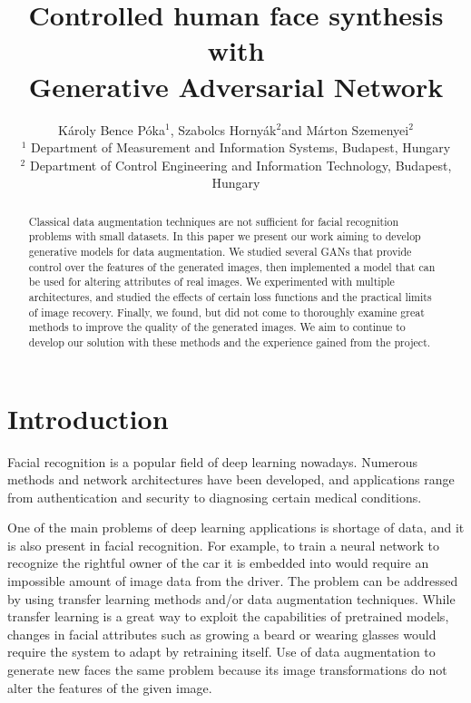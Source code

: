 \documentclass{egpubl}
\title{Controlled human face synthesis with\\
	 \space Generative Adversarial Network}
\author[Póka,Hornyák,Szemenyei]
	{Károly Bence Póka$^1$,
       Szabolcs Hornyák$^2$and
        Márton Szemenyei$^2$
        \\
        $^1$ Department of Measurement and Information Systems,
             Budapest, Hungary\\
        $^2$ Department of Control Engineering and Information Technology,
        Budapest, Hungary\\
       }
\begin{document}
\maketitle

\begin{abstract}
Classical data augmentation techniques are not sufficient for facial recognition problems with small datasets. In this paper we present our work aiming %
to develop generative models for data augmentation. We studied several GANs that provide control over the features of the generated images, then implemented %
a model that can be used for altering attributes of real images. We experimented with multiple architectures, and studied the effects of certain loss functions and the practical limits of image recovery. %
Finally, %
we found, but did not come to thoroughly examine great methods to improve the quality of the generated images. We aim to %
continue to develop our solution with these methods and the experience gained from the project.


\end{abstract}

\section{Introduction}

Facial recognition is a popular field of deep learning nowadays. Numerous methods and network architectures have been developed, %
and applications range from authentication and security to diagnosing certain medical conditions.

One of the main problems %
of deep learning applications is shortage of data, %
and it is also present %
in facial recognition. For example, %
to train a neural network to recognize the rightful owner of the car it is embedded into would require an impossible amount of image data from the driver. The problem can be addressed by using %
transfer learning methods and/or data augmentation techniques. While transfer learning is a great way to exploit the capabilities of pretrained models, changes in facial attributes such as growing a beard or wearing %
glasses would require the system to adapt by retraining itself. Use of data augmentation to generate new %
faces the same problem because its image transformations do not alter the features of the given image.
\end{document}

